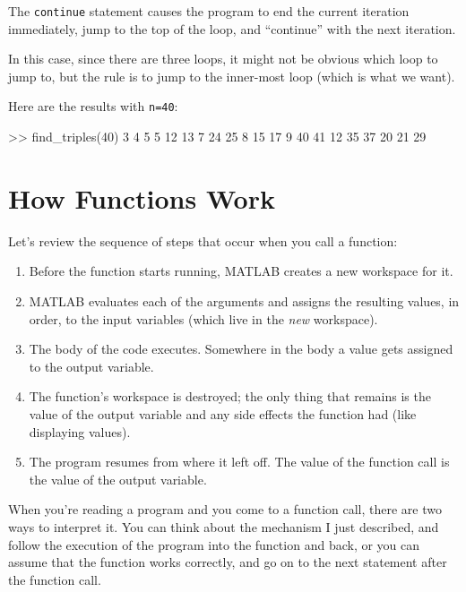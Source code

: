 The {\tt continue} statement  causes the program to end the current iteration
immediately, jump to the top of the loop, and ``continue'' with the next iteration.

In this case, since there are three loops, it might not be obvious which loop to jump to, but the rule is to jump to the inner-most loop (which is what we want).

Here are the results with {\tt n=40}:

\begin{code}
>> find_triples(40)
     3     4     5
     5    12    13
     7    24    25
     8    15    17
     9    40    41
    12    35    37
    20    21    29
\end{code}


\section{How Functions Work}

Let's review the sequence of steps that occur when you call a function:

\begin{enumerate}

\item Before the function starts running, MATLAB creates a new
workspace for it.

\item MATLAB evaluates each of the arguments and assigns
the resulting values, in order, to the input variables (which
live in the {\em new} workspace).

\item The body of the code executes.  Somewhere in the body
a value gets assigned to the output variable.

\item The function's workspace is destroyed; the only thing
that remains is the value of the output variable and any side
effects the function had (like displaying values).

\item The program resumes from where it left off.  The value
of the function call is the value of the output variable.

\end{enumerate}

When you're reading a program and you come to a function call,
there are two ways to interpret it. You can think about the mechanism I just described,
and follow the execution of the program into the function and back, or you can assume that the function works correctly, and go on to the next statement after the function call.

